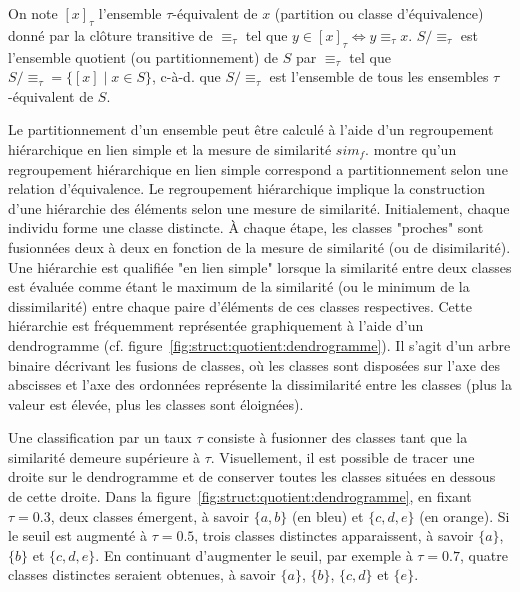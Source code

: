 \begin{definition}
    On note $[x]_\tau$ l'ensemble $\tau$-équivalent de $x$ (partition ou classe d'équivalence) donné par la clôture transitive de $\equiv_\tau$ tel que $y \in [x]_\tau \iff y \equiv_\tau x$.
    $S/\equiv_\tau$ est l'ensemble quotient (ou partitionnement) de $S$ par $\equiv_\tau$ tel que $S/\equiv_\tau = \{[x] \mid x \in S\}$, c-à-d. que $S/\equiv_\tau$ est l'ensemble de tous les ensembles $\tau$-équivalent de $S$.
\end{definition}

Le partitionnement d'un ensemble peut être calculé à l'aide d'un regroupement hiérarchique en lien simple et la mesure de similarité $sim_f$.
\cite{carlssonCharacterizationStabilityConvergence2010} montre qu'un regroupement hiérarchique en lien simple correspond a partitionnement selon une relation d'équivalence.
Le regroupement hiérarchique implique la construction d'une hiérarchie des éléments selon une mesure de similarité.
Initialement, chaque individu forme une classe distincte.
À chaque étape, les classes "proches" sont fusionnées deux à deux en fonction de la mesure de similarité (ou de disimilarité).
Une hiérarchie est qualifiée "en lien simple" lorsque la similarité entre deux classes est évaluée comme étant le maximum de la similarité (ou le minimum de la dissimilarité) entre chaque paire d'éléments de ces classes respectives.
Cette hiérarchie est fréquemment représentée graphiquement à l'aide d'un dendrogramme (cf. figure~\ref{fig:struct:quotient:dendrogramme}).
Il s'agit d'un arbre binaire décrivant les fusions de classes, où les classes sont disposées sur l'axe des abscisses et l'axe des ordonnées représente la dissimilarité entre les classes (plus la valeur est élevée, plus les classes sont éloignées).

Une classification par un taux $\tau$ consiste à fusionner des classes tant que la similarité demeure supérieure à $\tau$.
Visuellement, il est possible de tracer une droite sur le dendrogramme et de conserver toutes les classes situées en dessous de cette droite.
Dans la figure~\ref{fig:struct:quotient:dendrogramme}, en fixant $\tau = 0.3$, deux classes émergent, à savoir $\{a, b\}$ (en bleu) et $\{c, d, e\}$ (en orange).
Si le seuil est augmenté à $\tau = 0.5$, trois classes distinctes apparaissent, à savoir $\{a\}$, $\{b\}$ et $\{c, d, e\}$.
En continuant d'augmenter le seuil, par exemple à $\tau = 0.7$, quatre classes distinctes seraient obtenues, à savoir $\{a\}$, $\{b\}$, $\{c, d\}$ et $\{e\}$.

